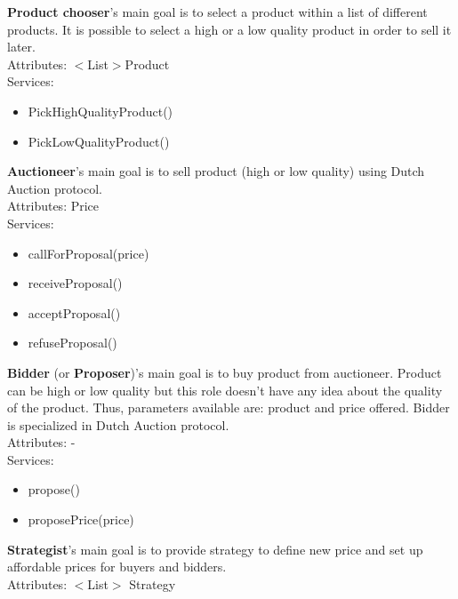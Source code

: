 \documentclass[a4paper,11pt]{report}
\begin{document}
  \begin{multicols}{2}
  \begin{mdframed}
  \textbf{Product chooser}'s main goal is to select a product within a list of different 
  products. It is possible to select a high or a low quality product in order to sell it 
  later.\\
  Attributes: $<$List$>$Product\\
  Services:
  \begin{itemize}
    \itemsep0pt
    \item PickHighQualityProduct()
    \item PickLowQualityProduct()
  \end{itemize}
  \end{mdframed}
  \begin{mdframed}
  \textbf{Auctioneer}'s main goal is to sell product (high or low quality) using Dutch Auction 
  protocol.\\
  Attributes: Price\\
  Services:
  \begin{itemize}
    \itemsep0pt
    \item callForProposal(price)
    \item receiveProposal()
    \item acceptProposal()
    \item refuseProposal()
  \end{itemize}
  \end{mdframed}
  \begin{mdframed}
  \textbf{Bidder} (or \textbf{Proposer})'s main goal is to buy product from auctioneer. Product 
  can be high or low quality but this role doesn't have any idea about the quality of the 
  product. Thus, parameters available are: product and price offered. Bidder is specialized 
  in Dutch Auction protocol.\\
  Attributes: -\\
  Services: 
  \begin{itemize}
   \itemsep0pt
   \item propose()
   \item proposePrice(price)
  \end{itemize}
  \end{mdframed}
  \begin{mdframed}
  \textbf{Strategist}'s main goal is to provide strategy to define new price and set up affordable 
  prices for buyers and bidders.\\
  Attributes: $<$List$>$ Strategy\\

\end{mdframed}
\end{multicols}
\end{document}
